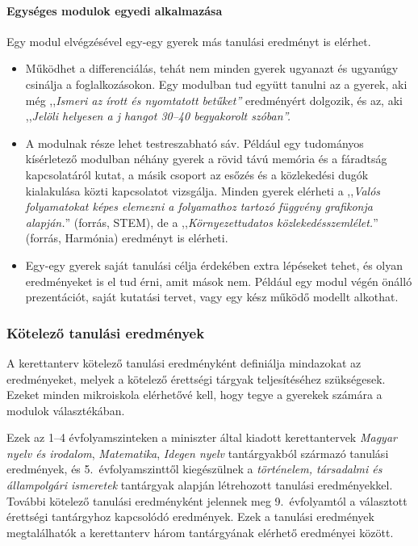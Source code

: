 \paragraph{Egységes modulok egyedi alkalmazása}

Egy modul elvégzésével egy-egy gyerek más tanulási eredményt is elérhet.

\begin{itemize}
      \item
            Működhet a differenciálás, tehát nem minden gyerek ugyanazt és ugyanúgy csinálja a foglalkozásokon. Egy modulban tud együtt	tanulni az a gyerek, aki még ,,\emph{Ismeri az írott és nyomtatott  betűket''} eredményért dolgozik, és az, aki ,,\emph{Jelöli helyesen a j	hangot 30--40 begyakorolt szóban''.}
      \item
            A modulnak része lehet testreszabható sáv. Például egy tudományos kísérletező modulban néhány gyerek a rövid távú memória és a	fáradtság kapcsolatáról kutat, a másik csoport az esőzés és a	közlekedési dugók kialakulása közti kapcsolatot vizsgálja. Minden  gyerek elérheti a ,,\emph{Valós folyamatokat képes elemezni a folyamathoz tartozó függvény grafikonja alapján.}'' (forrás, STEM), de a ,,\emph{Környezettudatos közlekedésszemlélet.}'' (forrás, Harmónia)	eredményt is elérheti.
      \item
            Egy-egy gyerek saját tanulási célja érdekében extra lépéseket tehet, és olyan eredményeket is el tud érni, amit mások nem.	Például egy modul végén önálló prezentációt, saját kutatási  tervet, vagy egy kész működő modellt alkothat.
\end{itemize}

\subsubsection{Kötelező tanulási eredmények}
\label{sec:kotelezo_tanulasi_eredmenyek}
A kerettanterv kötelező tanulási eredményként definiálja mindazokat az eredményeket, melyek a kötelező érettségi tárgyak teljesítéséhez szükségesek. Ezeket minden mikroiskola elérhetővé kell, hogy tegye a gyerekek számára a modulok választékában.

Ezek az 1--4 évfolyamszinteken a miniszter által kiadott kerettantervek \emph{Magyar nyelv és irodalom}, \emph{Matematika}, \emph{Idegen nyelv} tantárgyakból származó tanulási eredmények, és 5.~évfolyamszinttől kiegészülnek a \emph{történelem, társadalmi és állampolgári ismeretek} tantárgyak alapján létrehozott tanulási eredményekkel. További kötelező tanulási eredményként jelennek meg 9.~évfolyamtól a választott érettségi tantárgyhoz kapcsolódó eredmények. Ezek a tanulási eredmények megtalálhatók a kerettanterv három tantárgyának elérhető eredményei között.

